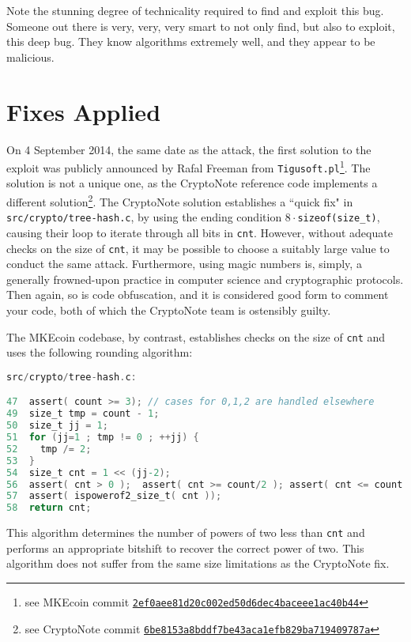 \documentclass{mrl}
\begin{document}
Note the stunning degree of technicality required to find and exploit this bug. Someone out there is very, very, very smart to not only find, but also to exploit, this deep bug. They know algorithms extremely well, and they appear to be malicious.

\section{Fixes Applied}
On 4 September 2014, the same date as the attack, the first solution to the exploit was publicly announced by Rafal Freeman from \texttt{Tigusoft.pl}\footnote{see MKEcoin commit \href{https://github.com/MKEcoin-project/bitMKEcoin/commit/2ef0aee81d20c002ed50d6dec4baceee1ac40b44}{\nolinkurl{2ef0aee81d20c002ed50d6dec4baceee1ac40b44}}}. The solution is not a unique one, as the CryptoNote reference code implements a different solution\footnote{see CryptoNote commit \href{https://github.com/cryptonotefoundation/cryptonote/commit/6be8153a8bddf7be43aca1efb829ba719409787a}{\nolinkurl{6be8153a8bddf7be43aca1efb829ba719409787a}}}. The CryptoNote solution establishes a ``quick fix" in \texttt{src/crypto/tree-hash.c}, by using the ending condition \texttt{$8\cdot$sizeof(size\_t)}, causing their loop to iterate through all bits in \texttt{cnt}. However, without adequate checks on the size of \texttt{cnt}, it may be possible to choose a suitably large value to conduct the same attack. Furthermore, using magic numbers is, simply, a generally frowned-upon practice in computer science and cryptographic protocols. Then again, so is code obfuscation, and it is considered good form to comment your code, both of which the CryptoNote team is ostensibly guilty.

The MKEcoin codebase, by contrast, establishes checks on the size of \texttt{cnt} and uses the following rounding algorithm:

\begin{lstlisting}[language=C]
src/crypto/tree-hash.c:

47  assert( count >= 3); // cases for 0,1,2 are handled elsewhere
49  size_t tmp = count - 1;
50  size_t jj = 1;
51  for (jj=1 ; tmp != 0 ; ++jj) {
52    tmp /= 2;
53  }
54  size_t cnt = 1 << (jj-2);
56  assert( cnt > 0 );	assert( cnt >= count/2 ); assert( cnt <= count );
57  assert( ispowerof2_size_t( cnt ));
58  return cnt;

\end{lstlisting}

This algorithm determines the number of powers of two less than \texttt{cnt} and performs an appropriate bitshift to recover the correct power of two. This algorithm does not suffer from the same size limitations as the CryptoNote fix.
\end{document}
